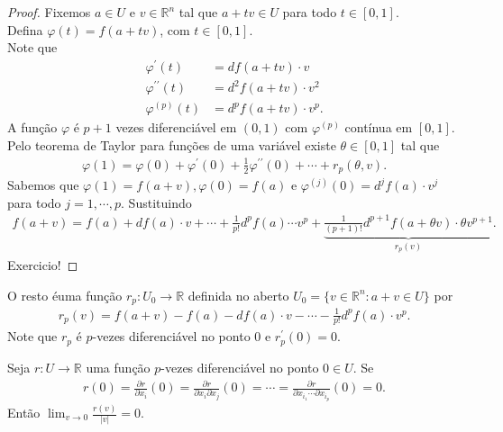 \begin{proof} 
  Fixemos $a\in U$ e $v\in\mathbb{R}^{n}$ tal que $a+tv\in U$ para todo $t\in[0,1]$.\\
  Defina $\varphi(t)=f(a+tv)$, com $t\in[0,1]$.\\
  Note que
  \begin{align*}
    \varphi^{\prime}(t)&=df(a+tv)\cdot v\\
    \varphi^{\prime\prime}(t)&=d^{2}f(a+tv)\cdot v^{2}\\
    \varphi^{(p)}(t)&=d^{p}f(a+tv)\cdot v^{p}.
  \end{align*}
  A função $\varphi$ é $p+1$ vezes diferenciável em $(0,1)$ com $\varphi^{(p)}$ contínua em $[0,1]$.\\
  Pelo teorema de Taylor para funções de uma variável existe $\theta\in[0,1]$ tal que
  \begin{align*}
    \varphi(1)=\varphi(0)+\varphi^{\prime}(0)+\frac{1}{2}\varphi^{\prime\prime}(0)+\cdots+r_p(\theta,v).
  \end{align*}
  Sabemos que $\varphi(1)=f(a+v),\varphi(0)=f(a)$ e $\varphi^{(j)}(0)=d^{j}f(a)\cdot v^{j}$ para todo $j=1,\cdots,p$. Sustituindo
  \begin{align*}
    f(a+v)=f(a)+df(a)\cdot v+\cdots+\frac{1}{p!}d^{p}f(a)\cdots v^{p}+\underbrace{\frac{1}{(p+1)!}d^{p+1}f(a+\theta v)\cdot \theta v^{p+1}}_{r_p(v)}.
  \end{align*}
  Exercicio!
\end{proof}
O resto éuma função $r_p:U_0\to\mathbb{R}$ definida no aberto $U_0=\{v\in\mathbb{R}^{n}:a+v\in U\}$ por
\begin{align*}
  r_p(v)=f(a+v)-f(a)-df(a)\cdot v-\cdots-\frac{1}{p!}d^{p}f(a)\cdot v^{p}.
\end{align*}
Note que $r_p$ é $p$-vezes diferenciável no ponto $0$ e $r_p^{\prime}(0)=0$.
\begin{lemma}
  Seja $r:U\to\mathbb{R}$ uma função $p$-vezes diferenciável no ponto $0\in U$. Se
  \begin{align*}
    r(0)=\frac{\partial r}{\partial x_i}(0)=\frac{\partial r}{\partial x_i\partial x_j}(0)=\cdots=\frac{\partial r}{\partial x_{i_1}\cdots\partial x_{i_p}}(0)=0.
  \end{align*}
  Então $\displaystyle \lim_{v \to 0}\frac{r(v)}{|v|}=0$.
\end{lemma}
